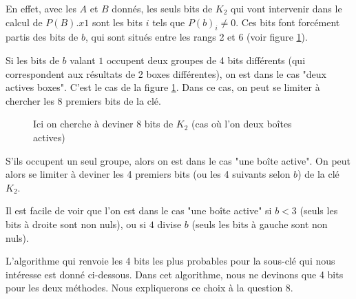 En effet, avec les $A$ et $B$ donnés, les seuls bits de $K_2$ qui vont intervenir dans le calcul de $P(B).x1$ sont les bits $i$ tels que $P(b)_i \neq 0$. Ces bits font forcément partis des bits de $b$, qui sont situés entre les rangs 2 et 6 (voir figure 
\ref{illustration_bits_key}).

Si les bits de $b$ valant $1$ occupent deux groupes de 4 bits différents (qui correspondent aux résultats de 2 boxes différentes), on est dans le cas "deux actives boxes". C'est le cas de la figure \ref{illustration_bits_key}. Dans ce cas, on peut se limiter à chercher les 8 premiers bits de la clé.


\begin{figure}[!ht]
\centering
{}
\caption{Ici on cherche à deviner 8 bits de $K_2$ (cas où l'on deux boîtes actives)}
\label{illustration_bits_key}
\end{figure}


S'ils occupent un seul groupe, alors on est dans le cas "une boîte active". On peut alors se limiter à deviner les 4 premiers bits (ou les 4 suivants selon $b$) de la clé $K_2$.

Il est facile de voir que l'on est dans le cas "une boîte active" si $b < 3$ (seuls les bits à droite sont non nuls), ou si $4$ divise $b$ (seuls les bits à gauche sont non nuls).

L'algorithme qui renvoie les 4 bits les plus probables pour la sous-clé qui nous intéresse est donné ci-dessous. Dans cet algorithme, nous ne devinons que 4 bits pour les deux méthodes. Nous expliquerons ce choix à la question 8.

